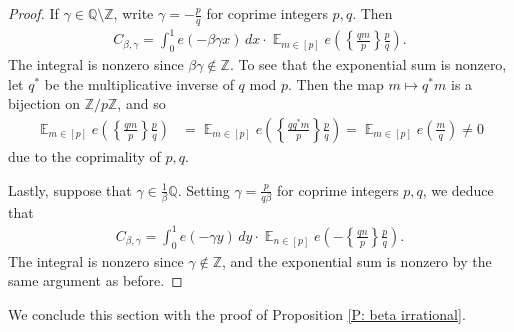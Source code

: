 \documentclass[11pt]{amsart}
\theoremstyle{definition}
\DeclareMathOperator*{\E}{\mathbb{E}}
\newcommand{\Q}{{\mathbb Q}}
\newcommand{\Z}{{\mathbb Z}}
\newcommand{\1}{{\mathbf{1}}}
\newcommand{\brac}[1]{\mathopen{}\left( #1 \mathclose{}\right)}
\newcommand{\rem}[1]{\left \{ #1 \right \}}
\begin{document}
\begin{proof}
If $\gamma\in\Q\setminus\Z$, write $\gamma = -\frac{p}{q}$ for coprime integers $p,q$. Then 
\begin{align*}
C_{\beta, \gamma} = \int_0^1 e(-\beta \gamma x)\, dx \cdot \E_{m\in[p]} e\brac{\rem{\frac{qm}{p}}\frac{p}{q}}.
\end{align*}
The integral is nonzero since $\beta\gamma\notin\Z$. To see that the exponential sum is nonzero, let $q^*$ be the multiplicative inverse of $q$ mod $p$. Then the map $m\mapsto q^* m$ is a bijection on $\Z/p\Z$, and so 
\begin{align*}
	\E_{m\in[p]} e\brac{\rem{\frac{qm}{p}}\frac{p}{q}} &= \E_{m\in[p]} e\brac{\rem{\frac{qq^*m}{p}}\frac{p}{q}} = \E_{m\in[p]} e\brac{\frac{m}{q}}\neq 0 %
\end{align*}
due to the coprimality of $p,q$.

Lastly, suppose that $\gamma\in\frac{1}{\beta}\Q$. Setting $\gamma = \frac{p}{q\beta}$ for coprime integers $p,q$, we deduce that
\begin{align*}
	C_{\beta, \gamma} = \int_0^1 e(-\gamma y)\, dy \cdot  \E_{n\in[p]} e\brac{-\rem{\frac{qn}{p}}\frac{p}{q}}.
\end{align*}
The integral is nonzero since $\gamma\notin\Z$, and the exponential sum is nonzero by the same argument as before.
\end{proof}
We conclude this section with the proof of Proposition \ref{P: beta irrational}.
\end{document}

